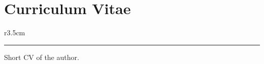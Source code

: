 \chapter*{Curriculum Vitae}
\thispagestyle{empty}

\begin{wrapfigure}{r}{3.5cm}
    \rule{3.5cm}{4.5cm}
\end{wrapfigure}

Short CV of the author.
\blindtext
